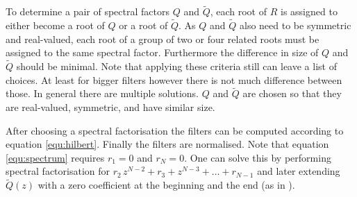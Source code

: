\documentclass[a4paper,12pt]{book}
\begin{document}
To determine a pair of spectral factors $Q$ and $\widetilde{Q}$, each root of
$R$ is assigned to either become a root of $Q$ or a root of $\widetilde{Q}$.
As $Q$ and $\widetilde{Q}$ also need to be symmetric and real-valued, each
root of a group of two or four related roots must be assigned to the same
spectral factor. Furthermore the difference in size of $Q$ and $\widetilde{Q}$
should be minimal. Note that applying these criteria still can leave a list of
choices. At least for bigger filters however there is not much difference
between those.
In general there are multiple solutions. $Q$ and $\widetilde{Q}$ are chosen so
that they are real-valued, symmetric, and have similar size.

After choosing a spectral factorisation the filters can be computed according
to equation \ref{equ:hilbert}. Finally the filters are normalised. Note that
equation \ref{equ:spectrum} requires $r_1=0$ and $r_N=0$. One can
solve this by performing spectral factorisation for
$r_2\,z^{N-2}+r_3+z^{N-3}+\ldots+r_{N-1}$ and later extending
$\widetilde{Q}(z)$ with a zero coefficient at the
beginning and the end (as in \cite{RefWorks:396}).
\end{document}
